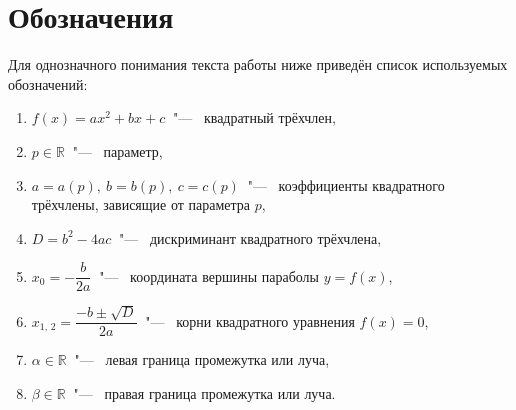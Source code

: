 \section {Обозначения}

Для однозначного понимания текста работы ниже приведён список используемых обозначений:

\begin {enumerate} [labelindent=\parindent, leftmargin=*]
    \item {$f(x) = ax^2 + bx + c \ $ "--- \ квадратный трёхчлен,}
    \item {$p \in \mathbb{R} \ $ "--- \ параметр,}
    \item {$a = a(p), \ b = b(p), \ c = c(p) \ $ "--- \ коэффициенты квадратного трёхчлены, 
           зависящие от параметра $ p $,}
    \item {$D = b^2 - 4ac \ $ "--- \ дискриминант квадратного трёхчлена,}
    \item {$x_0 = - \dfrac{b}{2a} \ $ "--- \ координата вершины параболы $ y = f(x) $,}
    \item {$x_{1,\,2} = \dfrac{- b \pm \sqrt{D}}{2a} \ $ "--- \ корни квадратного уравнения
           $f(x) = 0 $,}
    \item {$\alpha \in \mathbb{R} \ $ "--- \ левая граница промежутка или луча,}
    \item {$\beta \in \mathbb{R} \ $ "--- \ правая граница промежутка или луча.}
\end {enumerate}